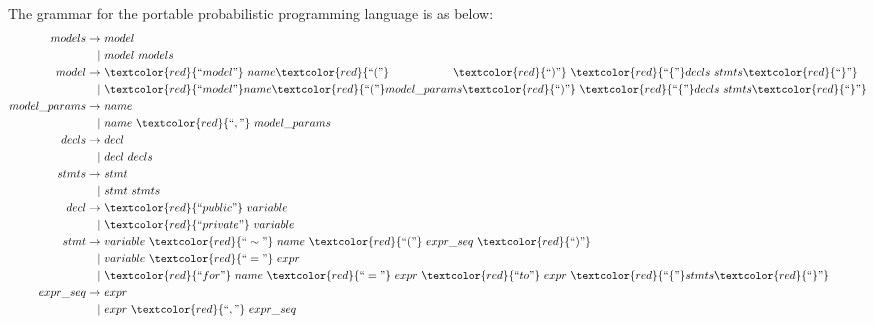 The grammar for the portable probabilistic programming language is as below:
\begin{align*}
           models \rightarrow & ~model \\
                   |& ~model ~models \\       
            model \rightarrow & ~\textcolor{red}{``model"} ~name \textcolor{red}{``("}~~~~~~~~~~~~~~~~~ \textcolor{red}{``)"} ~ \textcolor{red}{``\{"} decls ~stmts \textcolor{red}{``\}"} \\
                   |& ~\textcolor{red}{``model"} name \textcolor{red}{``("} model\_params \textcolor{red}{``)"} ~\textcolor{red}{``\{"} decls ~stmts \textcolor{red}{``\}"} \\         
     model\_params \rightarrow & ~name \\
                   |& ~name ~\textcolor{red}{``,"}~ model\_params \\        
            decls \rightarrow & ~decl \\
                   |& ~decl ~decls \\ 
            stmts \rightarrow & ~stmt \\
                   |& ~stmt ~stmts \\        
             decl \rightarrow & ~\textcolor{red}{``public"} ~variable \\
                   |& ~\textcolor{red}{``private"} ~variable \\         
             stmt \rightarrow & ~variable ~\textcolor{red}{``\sim"} ~name ~\textcolor{red}{``("} ~expr\_seq ~\textcolor{red}{``)"} \\
                   |& ~variable ~\textcolor{red}{``="} ~expr \\
                   |& ~\textcolor{red}{``for"} ~name ~\textcolor{red}{``="} ~expr ~\textcolor{red}{``to"} ~expr ~\textcolor{red}{``\{"} stmts \textcolor{red}{``\}"} \\        
         expr\_seq \rightarrow & ~expr \\
                   |& ~expr ~\textcolor{red}{``,"} ~expr\_seq \\      
\end{align*}

